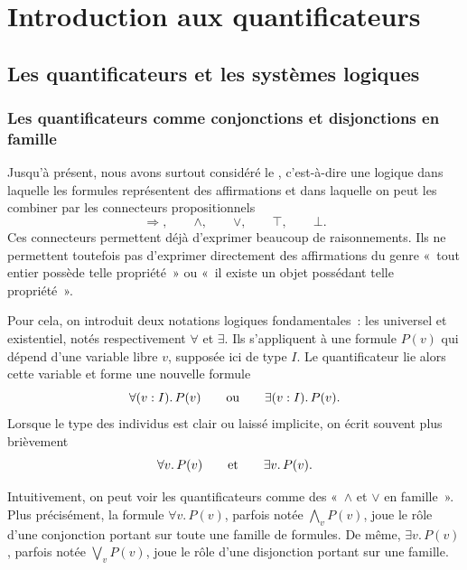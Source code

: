 \chapter{Introduction aux quantificateurs}
\label{chapter-quantifiers}

{\footnotesize\noindent
{}\par}

\section{Les quantificateurs et les systèmes logiques}

\subsection{Les quantificateurs comme conjonctions et disjonctions en
famille}

\thingy
Jusqu'à présent, nous avons surtout considéré le , c'est-à-dire une logique dans laquelle les formules
représentent des affirmations et dans laquelle on peut les combiner par
les connecteurs propositionnels
\[
\Rightarrow,\qquad \land,\qquad \lor,\qquad \top,\qquad \bot.
\]
Ces connecteurs permettent déjà d'exprimer beaucoup de raisonnements.
Ils ne permettent toutefois pas d'exprimer directement des affirmations
du genre « tout entier possède telle propriété » ou « il existe un objet
possédant telle propriété ».

\thingy
Pour cela, on introduit deux notations logiques fondamentales : les
 universel et existentiel, notés respectivement
$\forall$ et $\exists$.  Ils s'appliquent à une formule $P(v)$ qui
dépend d'une variable libre $v$, supposée ici de type $I$.  Le
quantificateur lie alors cette variable et forme une nouvelle formule
\[
\forall (v:I).\,P(v)
\qquad\hbox{ou}\qquad
\exists (v:I).\,P(v).
\]
Lorsque le type des individus est clair ou laissé implicite, on écrit
souvent plus brièvement
\[
\forall v.\,P(v)
\qquad\hbox{et}\qquad
\exists v.\,P(v).
\]

\thingy
Intuitivement, on peut voir les quantificateurs comme des « $\land$ et
$\lor$ en famille ».  Plus précisément, la formule $\forall v.\,P(v)$,
parfois notée $\bigwedge_v P(v)$, joue le rôle d'une conjonction portant
sur toute une famille de formules.  De même, $\exists v.\,P(v)$, parfois
notée $\bigvee_v P(v)$, joue le rôle d'une disjonction portant sur une
famille.

